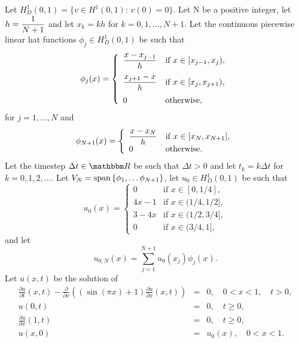 
Let $H^1_D\left(0,1\right)=\{v\in H^1\left(0,1\right):\,v(0)=0\}$. Let N be a positive integer, let $\displaystyle{h={1 \over N+1}}$ and let $x_k=kh$ for $k=0,1,\ldots,N+1$. Let the continuous piecewise linear hat functions $\phi_j\in H^1_D(0,1)$ be such that
\[
\phi_j(x) = \left\{\begin{array}{ll}
\displaystyle{{x-x_{j-1} \over h}} & \displaystyle{\mbox{if }x\in[x_{j-1},x_j)},
\\[10pt]
\displaystyle{{x_{j+1}-x \over h}} & \displaystyle{\mbox{if }x\in[x_j,x_{j+1})},
\\[10pt]
0 & \mbox{otherwise},
\end{array}\right.
\]
for $j=1,\ldots,N$ and
\[
\phi_{N+1}(x) = \left\{\begin{array}{ll}
\displaystyle{x-x_N \over h} & \mbox{if }x\in[x_N,x_{N+1}],\\
0& \mbox{otherwise.}
\end{array}\right.
\]
Let the timestep $\Delta t\in\R$ be such that $\Delta t>0$ and let $t_k=k\Delta t$ for $k=0,1,2,\ldots$. Let $V_N={\rm span}\left\{\phi_1,\ldots\phi_{N+1}\right\}$, let $u_0\in H^1_D(0,1)$ be such that
\[
u_0(x)=\left\{\begin{array}{ll}
0 & \mbox{if }x\in[0,1/4],\\
4x-1 & \mbox{if }x\in(1/4,1/2],\\
3-4x & \mbox{if }x\in(1/2,3/4],\\
0 & \mbox{if }x\in(3/4,1],
\end{array}\right.
\]
and let
\[
u_{0,N}(x)=\sum_{j=1}^{N+1}u_0(x_j)\phi_j(x).
\]
Let $u(x,t)$ be the solution of
\begin{eqnarray*}
\frac{\partial u}{\partial t}(x,t) - \frac{\partial}{\partial x}\left((\sin(\pi x)+1)\frac{\partial u}{\partial x}(x,t)\right)&=&0, \quad 0<x<1, \quad t>0,\\
u(0,t)&=&0, \quad t\ge0,\\
\frac{\partial u}{\partial x}(1,t)&=&0, \quad t\ge0,\\
u(x,0)&=&u_0(x), \quad 0<x<1.
\end{eqnarray*}
\\
